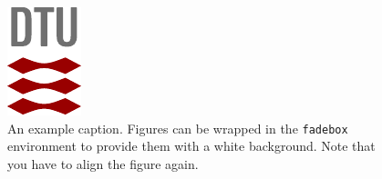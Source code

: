\documentclass[
]{dtuposter}
\begin{document}
\begin{dtupostercontent}
\begin{figure}
  \begin{fadebox}\begin{center}
    \includegraphics[width=.5\linewidth,angle=-90,origin=c]{tex_dtu_logo}
  \end{center}\end{fadebox}
  \caption{An example caption. Figures can be wrapped in the \texttt{fadebox} 
environment to provide them with a white background. Note that you have to align the 
figure again.}\label{fig:example2}
\end{figure}

\end{dtupostercontent}
\end{document}
